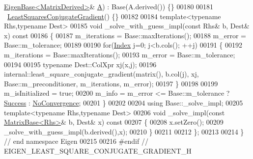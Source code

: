 \begin{DoxyCode}
      \hyperlink{group___core___module_struct_eigen_1_1_eigen_base}{EigenBase<MatrixDerived>}& \hyperlink{group___core___module_class_eigen_1_1_matrix}{A}) : Base(A.derived()) \{\}
00180 
00181   ~\hyperlink{group___iterative_linear_solvers___module_class_eigen_1_1_least_squares_conjugate_gradient}{LeastSquaresConjugateGradient}() \{\}
00182 
00184   \textcolor{keyword}{template}<\textcolor{keyword}{typename} Rhs,\textcolor{keyword}{typename} Dest>
00185   \textcolor{keywordtype}{void} \_solve\_with\_guess\_impl(\textcolor{keyword}{const} Rhs& b, Dest& x)\textcolor{keyword}{ const}
00186 \textcolor{keyword}{  }\{
00187     m\_iterations = Base::maxIterations();
00188     m\_error = Base::m\_tolerance;
00189 
00190     \textcolor{keywordflow}{for}(\hyperlink{namespace_eigen_a62e77e0933482dafde8fe197d9a2cfde}{Index} j=0; j<b.cols(); ++j)
00191     \{
00192       m\_iterations = Base::maxIterations();
00193       m\_error = Base::m\_tolerance;
00194 
00195       \textcolor{keyword}{typename} Dest::ColXpr xj(x,j);
00196       internal::least\_square\_conjugate\_gradient(matrix(), b.col(j), xj, Base::m\_preconditioner, 
      m\_iterations, m\_error);
00197     \}
00198 
00199     m\_isInitialized = \textcolor{keyword}{true};
00200     m\_info = m\_error <= Base::m\_tolerance ? \hyperlink{group__enums_gga85fad7b87587764e5cf6b513a9e0ee5ea52581b035f4b59c203b8ff999ef5fcea}{Success} : \hyperlink{group__enums_gga85fad7b87587764e5cf6b513a9e0ee5eaba1c8763d1179778070f365ecc4157a8}{NoConvergence};
00201   \}
00202   
00204   \textcolor{keyword}{using} Base::\_solve\_impl;
00205   \textcolor{keyword}{template}<\textcolor{keyword}{typename} Rhs,\textcolor{keyword}{typename} Dest>
00206   \textcolor{keywordtype}{void} \_solve\_impl(\textcolor{keyword}{const} \hyperlink{group___core___module_class_eigen_1_1_matrix_base}{MatrixBase<Rhs>}& b, Dest& x)\textcolor{keyword}{ const}
00207 \textcolor{keyword}{  }\{
00208     x.setZero();
00209     \_solve\_with\_guess\_impl(b.derived(),x);
00210   \}
00211 
00212 \};
00213 
00214 \} \textcolor{comment}{// end namespace Eigen}
00215 
00216 \textcolor{preprocessor}{#endif // EIGEN\_LEAST\_SQUARE\_CONJUGATE\_GRADIENT\_H}
\end{DoxyCode}
